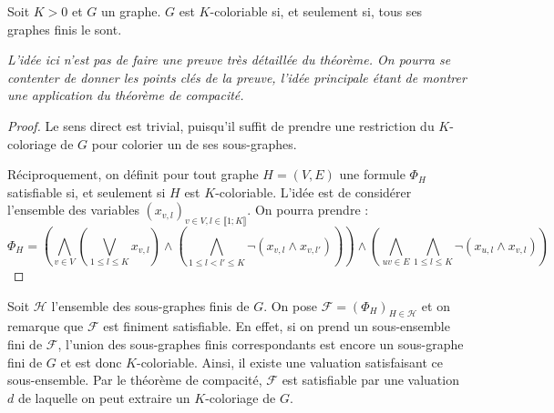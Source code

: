 \begin{theorem}
Soit $K>0$ et $G$ un graphe. $G$ est $K$-coloriable si, et seulement si, tous ses graphes finis le sont.
\end{theorem}

\textit{L'idée ici n'est pas de faire une preuve très détaillée du théorème. On pourra se contenter de donner les points clés de la preuve, l'idée principale étant de montrer une application du théorème de compacité.}\newline

\begin{proof}
Le sens direct est trivial, puisqu'il suffit de prendre une restriction du $K$-coloriage de $G$ pour colorier un de ses sous-graphes. 

Réciproquement, on définit pour tout graphe $H=(V,E)$ une formule $\Phi_H$ satisfiable si, et seulement si $H$ est $K$-coloriable. L'idée est de considérer l'ensemble des variables $(x_{v,l})_{v\in V, l \in \llbracket 1 ; K \rrbracket }$. On pourra prendre :
$$
\Phi_H = \left( \bigwedge_{v\in V} \left( \bigvee_{1\leq l \leq K} x_{v,l} \right) \wedge \left( \bigwedge_{1\leq l < l' \leq K} \neg (x_{v,l} \wedge x_{v,l'}) \right)\right) \wedge \left( \bigwedge_{uv \in E} \bigwedge_{1\leq l\leq K} \neg(x_{u,l} \wedge x_{v,l})\right)
$$
\end{proof}

Soit $\mathcal{H}$ l'ensemble des sous-graphes finis de $G$. On pose $\mathcal{F} = (\Phi_H)_{H\in \mathcal{H}}$ et on remarque que $\mathcal{F}$ est finiment satisfiable. En effet, si on prend un sous-ensemble fini de $\mathcal{F}$, l'union des sous-graphes finis correspondants est encore un sous-graphe fini de $G$ et est donc $K$-coloriable. Ainsi, il existe une valuation satisfaisant ce sous-ensemble. Par le théorème de compacité, $\mathcal{F}$ est satisfiable par une valuation $d$ de laquelle on peut extraire un $K$-coloriage de $G$.


